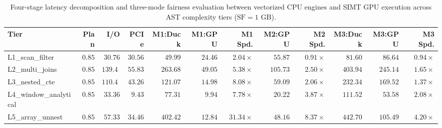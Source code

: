 \begin{table}[htbp]
\centering
\scriptsize
\setlength{\tabcolsep}{3.5pt}
\caption{Four-stage latency decomposition and three-mode fairness evaluation between vectorized CPU engines and SIMT GPU execution across AST complexity tiers ($\text{SF}=1$ GB).}
\label{tab:gpu_cpu_fairness}
\begin{tabular}{@{}lrrrrrrrrrrr@{}}
\toprule
\textbf{Tier} & \textbf{Plan} & \textbf{I/O} & \textbf{PCIe} & \textbf{M1:Duck} & \textbf{M1:GPU} & \textbf{M1 Spd.} & \textbf{M2:GPU} & \textbf{M2 Spd.} & \textbf{M3:Duck} & \textbf{M3:GPU} & \textbf{M3 Spd.} \\
\midrule
L1\_scan\_filter & $0.85$ & $30.76$ & $30.56$ & $49.99$ & $24.46$ & $2.04\times$ & $55.87$ & $0.91\times$ & $81.60$ & $86.64$ & $0.94\times$ \\
L2\_multi\_joins & $0.85$ & $139.42$ & $55.83$ & $263.68$ & $49.05$ & $5.38\times$ & $105.73$ & $2.50\times$ & $403.94$ & $245.14$ & $1.65\times$ \\
L3\_nested\_cte & $0.85$ & $110.42$ & $43.26$ & $121.07$ & $14.98$ & $8.08\times$ & $59.09$ & $2.06\times$ & $232.34$ & $169.52$ & $1.37\times$ \\
L4\_window\_analytical & $0.85$ & $33.36$ & $9.43$ & $77.31$ & $9.94$ & $7.78\times$ & $20.22$ & $3.87\times$ & $111.52$ & $53.58$ & $2.08\times$ \\
L5\_array\_unnest & $0.85$ & $57.33$ & $34.46$ & $402.42$ & $12.84$ & $31.34\times$ & $48.16$ & $8.37\times$ & $442.70$ & $105.49$ & $4.20\times$ \\
\bottomrule
\end{tabular}
\end{table}